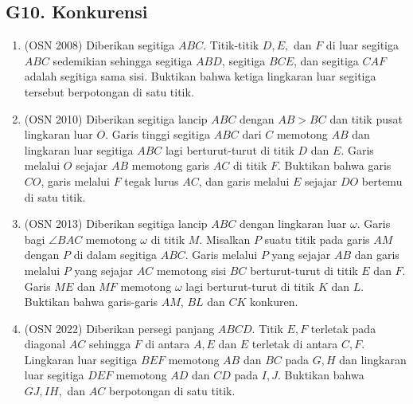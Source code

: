 \documentclass[12pt,a4paper]{article}
\begin{document}
\subsection{G10. Konkurensi}
\begin{enumerate}

\item (OSN 2008) Diberikan segitiga $ABC$. Titik-titik $D, E,$ dan $F$ di luar segitiga $ABC$ sedemikian sehingga segitiga $ABD$, segitiga $BCE$, dan segitiga $CAF$ adalah segitiga sama sisi. Buktikan bahwa ketiga lingkaran luar segitiga tersebut berpotongan di satu titik.

\item (OSN 2010) Diberikan segitiga lancip $ABC$ dengan $AB>BC$ dan titik pusat lingkaran luar $O$. Garis tinggi segitiga $ABC$ dari $C$ memotong $AB$ dan lingkaran luar segitiga $ABC$ lagi berturut-turut di titik $D$ dan $E$. Garis melalui $O$ sejajar $AB$ memotong garis $AC$ di titik $F$. Buktikan bahwa garis $CO$, garis melalui $F$ tegak lurus $AC$, dan garis melalui $E$ sejajar $DO$ bertemu di satu titik.

\item (OSN 2013) Diberikan segitiga lancip $ABC$ dengan lingkaran luar $\omega$. Garis bagi $\angle BAC$ memotong $\omega$ di titik $M$. Misalkan $P$ suatu titik pada garis $AM$ dengan $P$ di dalam segitiga $ABC$. Garis melalui $P$ yang sejajar $AB$ dan garis melalui $P$ yang sejajar $AC$ memotong sisi $BC$ berturut-turut di titik $E$ dan $F$. Garis $ME$ dan $MF$ memotong $\omega$ lagi berturut-turut di titik $K$ dan $L$. Buktikan bahwa garis-garis $AM$, $BL$ dan $CK$ konkuren.

\item (OSN 2022) Diberikan persegi panjang $ABCD$. Titik $E, F$ terletak pada diagonal $AC$ sehingga $F$ di antara $A, E$ dan $E$ terletak di antara $C, F$. Lingkaran luar segitiga $BEF$ memotong $AB$ dan $BC$ pada $G, H$ dan lingkaran luar segitiga $DEF$ memotong $AD$ dan $CD$ pada $I, J$. Buktikan bahwa $GJ, IH,$ dan $AC$ berpotongan di satu titik.

\end{enumerate}
\end{document}
